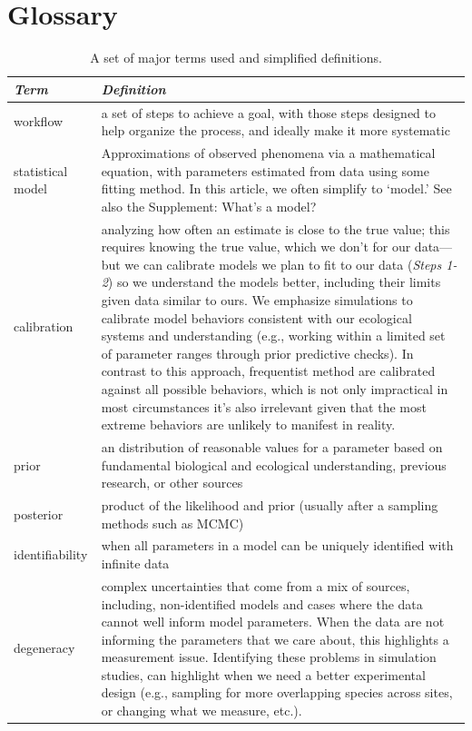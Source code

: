 \documentclass[11pt]{article}
\begin{document}
{\clearpage

\section{Glossary}


\begin{table}
\caption{A set of major terms used and simplified definitions.}
\begin{tabular}{ p{3 cm}  p{12 cm} }  \hline \hline
 \emph{Term}   & \emph{Definition}\\ 
\hline \hline
workflow & a set of steps to achieve a goal, with those steps designed to help organize the process, and ideally make it more systematic  \\\hline
statistical model & Approximations of observed phenomena via a mathematical equation, with parameters estimated from data using some fitting method. In this article, we often simplify to `model.' See also the Supplement: What's a model? \\\hline
calibration & analyzing how often an estimate is close to the true value; this requires knowing the true value, which we don't for our data---but we can calibrate models we plan to fit to our data (\emph{Steps 1-2}) so we understand the models better, including their limits given data similar to ours. We emphasize simulations to calibrate model behaviors consistent with our ecological systems and understanding (e.g., working within a limited set of parameter ranges through prior predictive checks). In contrast to this approach, frequentist method are calibrated against all possible behaviors, which is not only impractical in most circumstances it’s also irrelevant given that the most extreme behaviors are unlikely to manifest in reality. \\\hline
prior & an distribution of reasonable values for a parameter based on fundamental biological and ecological understanding, previous research, or other sources \\\hline
posterior & product of the likelihood and prior (usually after a sampling methods such as MCMC) \\\hline
identifiability & when all parameters in a model can be uniquely identified with infinite data \\\hline
degeneracy & complex uncertainties that come from a mix of sources, including, non-identified models and cases where the data cannot well inform model parameters. When the data are not informing the parameters that we care about, this highlights a measurement issue. Identifying these problems in simulation studies, can highlight when we need a better experimental design (e.g., sampling for more overlapping species across sites, or changing what we measure, etc.).  \\\hline
\hline
\end{tabular}
\label{tab:glossary}
\end{table}


}
\end{document}
